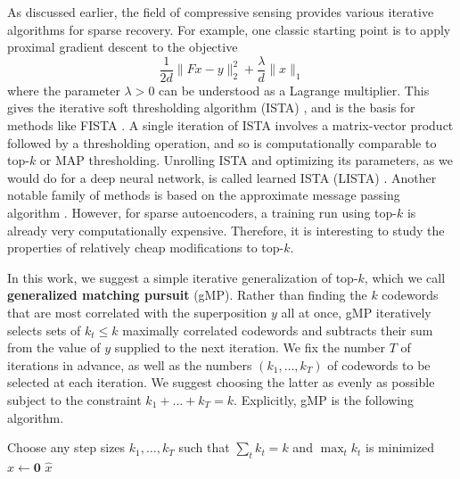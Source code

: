As discussed earlier, the field of compressive sensing provides various iterative algorithms for sparse recovery. For example, one classic starting point is to apply proximal gradient descent to the objective
$$
\frac {1}{2 d} \lVert F x - y \rVert_2^2 + \frac{\lambda}{d} \lVert x \rVert_1
$$
where the parameter $\lambda > 0$ can be understood as a Lagrange multiplier. This gives the iterative soft thresholding algorithm (ISTA) \citep{daubechies_iterative_2003}, and is the basis for methods like FISTA \citep{beck_fast_2009}. A single iteration of ISTA involves a matrix-vector product followed by a thresholding operation, and so is computationally comparable to top-$k$ or MAP thresholding. Unrolling ISTA and optimizing its parameters, as we would do for a deep neural network, is called learned ISTA (LISTA) \citep{gregor_learning_2010}. Another notable family of methods is based on the approximate message passing algorithm \citep{maleki_approximate_2010}. However, for sparse autoencoders, a training run using top-$k$ is already very computationally expensive. Therefore, it is interesting to study the properties of relatively cheap modifications to top-$k$.

In this work, we suggest a simple iterative generalization of top-$k$, which we call \textbf{generalized matching pursuit} (gMP). Rather than finding the $k$ codewords that are most correlated with the superposition $y$ all at once, gMP iteratively selects sets of $k_t \le k$ maximally correlated codewords and subtracts their sum from the value of $y$ supplied to the next iteration. We fix the number $T$ of iterations in advance, as well as the numbers $(k_1, \dots, k_T)$ of codewords to be selected at each iteration. We suggest choosing the latter as evenly as possible subject to the constraint $k_1 + \dots + k_T = k.$ Explicitly, gMP is the following algorithm.

\setlength{\algomargin}{1.5em}
\begin{algorithm}[h!]
Choose any step sizes $k_1, \ldots, k_T$ such that $\sum_t k_t = k$ and $\max_t k_t$ is minimized \;
$\hat{x} \gets \mathbf{0}$ \;
\Return $\hat{x}$
\caption{Generalized matching pursuit (gMP) with $T$ steps} \label{alg:gMP}
\end{algorithm}

